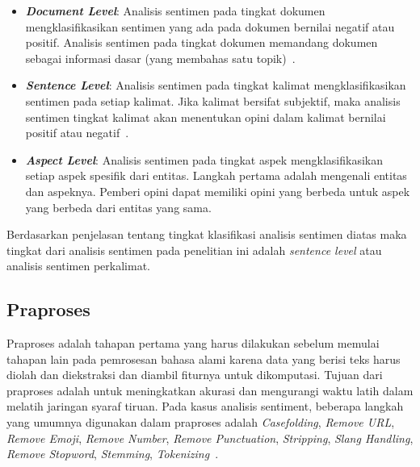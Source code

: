 \pagestyle{fancy}
\cfoot{}
\begin{itemize}
      \item \emph{\bfseries Document Level}: Analisis sentimen pada tingkat dokumen mengklasifikasikan sentimen yang ada pada dokumen bernilai negatif atau positif. Analisis sentimen pada tingkat dokumen memandang dokumen sebagai informasi dasar (yang membahas satu topik)~\citep{Medhat2014}.
      \item \emph{\bfseries Sentence Level}: Analisis sentimen pada tingkat kalimat mengklasifikasikan sentimen pada setiap kalimat. Jika kalimat bersifat subjektif, maka analisis sentimen tingkat kalimat akan menentukan opini dalam kalimat bernilai positif atau negatif~\citep{Medhat2014}.
      \item \emph{\bfseries Aspect Level}: Analisis sentimen pada tingkat aspek mengklasifikasikan setiap aspek spesifik dari entitas. Langkah pertama adalah mengenali entitas dan aspeknya. Pemberi opini dapat memiliki opini yang berbeda untuk aspek yang berbeda dari entitas yang sama.~\citep{Medhat2014}
\end{itemize}

Berdasarkan penjelasan tentang tingkat klasifikasi analisis sentimen diatas maka tingkat dari analisis
sentimen pada penelitian ini adalah \emph{sentence level} atau analisis sentimen perkalimat.

\subsection{Praproses}\label{Praproses}
Praproses adalah tahapan pertama yang harus dilakukan sebelum memulai tahapan lain pada
pemrosesan bahasa alami karena data yang berisi teks harus diolah dan diekstraksi dan diambil
fiturnya untuk dikomputasi. Tujuan dari praproses adalah untuk meningkatkan akurasi dan mengurangi
waktu latih dalam melatih jaringan syaraf tiruan. Pada kasus analisis sentiment, beberapa langkah
yang umumnya digunakan dalam praproses adalah \emph{Casefolding}, \emph{Remove URL},
\emph{Remove Emoji}, \emph{Remove Number}, \emph{Remove Punctuation}, \emph{Stripping},
\emph{Slang Handling}, \emph{Remove Stopword}, \emph{Stemming}, \emph{Tokenizing}~\citep{Resyanto2019}.

